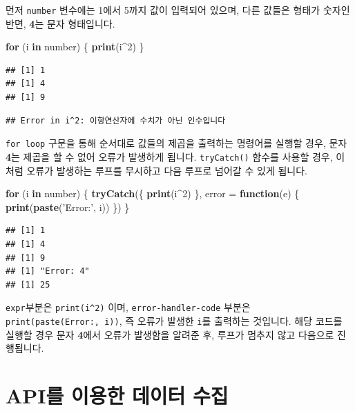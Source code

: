 \documentclass[]{book}
\newenvironment{Shaded}{\begin{snugshade}}{\end{snugshade}}
\newcommand{\ControlFlowTok}[1]{\textcolor[rgb]{0.13,0.29,0.53}{\textbf{#1}}}
\newcommand{\DataTypeTok}[1]{\textcolor[rgb]{0.13,0.29,0.53}{#1}}
\newcommand{\DecValTok}[1]{\textcolor[rgb]{0.00,0.00,0.81}{#1}}
\newcommand{\KeywordTok}[1]{\textcolor[rgb]{0.13,0.29,0.53}{\textbf{#1}}}
\newcommand{\NormalTok}[1]{#1}
\newcommand{\OperatorTok}[1]{\textcolor[rgb]{0.81,0.36,0.00}{\textbf{#1}}}
\newcommand{\StringTok}[1]{\textcolor[rgb]{0.31,0.60,0.02}{#1}}
\begin{document}
먼저 \texttt{number} 변수에는 1에서 5까지 값이 입력되어 있으며, 다른 값들은 형태가 숫자인 반면, \textbf{4}는 문자 형태입니다.

\begin{Shaded}
\begin{Highlighting}[]
\ControlFlowTok{for}\NormalTok{ (i }\ControlFlowTok{in}\NormalTok{ number) \{}
 \KeywordTok{print}\NormalTok{(i}\OperatorTok{^}\DecValTok{2}\NormalTok{)}
\NormalTok{\}}
\end{Highlighting}
\end{Shaded}

\begin{verbatim}
## [1] 1
## [1] 4
## [1] 9
\end{verbatim}

\begin{verbatim}
## Error in i^2: 이항연산자에 수치가 아닌 인수입니다
\end{verbatim}

\texttt{for\ loop} 구문을 통해 순서대로 값들의 제곱을 출력하는 명령어를 실행할 경우, 문자 \textbf{4}는 제곱을 할 수 없어 오류가 발생하게 됩니다. \texttt{tryCatch()} 함수를 사용할 경우, 이처럼 오류가 발생하는 루프를 무시하고 다음 루프로 넘어갈 수 있게 됩니다.

\begin{Shaded}
\begin{Highlighting}[]
\ControlFlowTok{for}\NormalTok{ (i }\ControlFlowTok{in}\NormalTok{ number) \{}
  \KeywordTok{tryCatch}\NormalTok{(\{}
    \KeywordTok{print}\NormalTok{(i}\OperatorTok{^}\DecValTok{2}\NormalTok{)}
\NormalTok{  \}, }\DataTypeTok{error =} \ControlFlowTok{function}\NormalTok{(e) \{}
    \KeywordTok{print}\NormalTok{(}\KeywordTok{paste}\NormalTok{(}\StringTok{'Error:'}\NormalTok{, i))}
\NormalTok{    \})}
\NormalTok{\}}
\end{Highlighting}
\end{Shaded}

\begin{verbatim}
## [1] 1
## [1] 4
## [1] 9
## [1] "Error: 4"
## [1] 25
\end{verbatim}

\texttt{expr}부분은 \texttt{print(i\^{}2)} 이며, \texttt{error-handler-code} 부분은 \texttt{print(paste(\textquotesingle{}Error:\textquotesingle{},\ i))}, 즉 오류가 발생한 \texttt{i}를 출력하는 것입니다. 해당 코드를 실행할 경우 문자 \textbf{4}에서 오류가 발생함을 알려준 후, 루프가 멈추지 않고 다음으로 진행됩니다.

\hypertarget{api---}{%
\chapter{API를 이용한 데이터 수집}\label{api---}}
\end{document}
